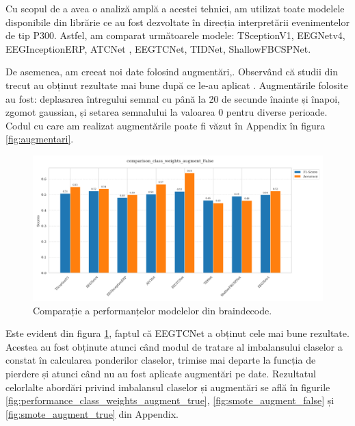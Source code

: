 Cu scopul de a avea o analiză amplă a acestei tehnici, am utilizat toate modelele disponibile din librărie ce au fost dezvoltate în direcția interpretării evenimentelor de tip P300. Astfel, am comparat următoarele modele: TSceptionV1\cite{TSception}, EEGNetv4\cite{eegnetv4}, EEGInceptionERP\cite{eeginceptionerp}, ATCNet \cite{atcnet1}\cite{atcnet2}\cite{atcnet3}, EEGTCNet\cite{tcnet}, TIDNet\cite{tidnet}, ShallowFBCSPNet\cite{ShallowFBCSPNet}.

De asemenea, am creeat noi date folosind augmentări,. Observând că studii din trecut au obținut rezultate mai bune după ce le-au aplicat \cite{Wang2018}. Augmentările folosite au fost: deplasarea întregului semnal cu până la 20 de secunde înainte și înapoi, zgomot gaussian, și setarea semnalului la valoarea 0 pentru diverse perioade. Codul cu care am realizat augmentările poate fi văzut în Appendix în figura \ref{fig:augmentari}.

\vspace{1em}
\begin{figure}[H]
\begin{center}

\end{center}
    \centering
		\vspace{-1em}
    \includegraphics[width=1\textwidth]{images/comparison_class_weights_augment_False.png}
    \caption{Comparație a performanțelor modelelor din braindecode\cite{braindecode}.}
		\vspace{-1em}
    \label{fig:performanta_braindecode}
\end{figure}

Este evident din figura \ref{fig:performanta_braindecode}, faptul că EEGTCNet\cite{tcnet} a obținut cele mai bune rezultate. Acestea au fost obținute atunci când modul de tratare al imbalansului claselor a constat în calcularea ponderilor claselor, trimise mai departe la funcția de pierdere și atunci când nu au fost aplicate augmentări pe date. Rezultatul celorlalte abordări privind imbalansul claselor și augmentări se află în figurile \ref{fig:performance_class_weights_augment_true}, \ref{fig:smote_augment_false} și \ref{fig:smote_augment_true} din Appendix.


